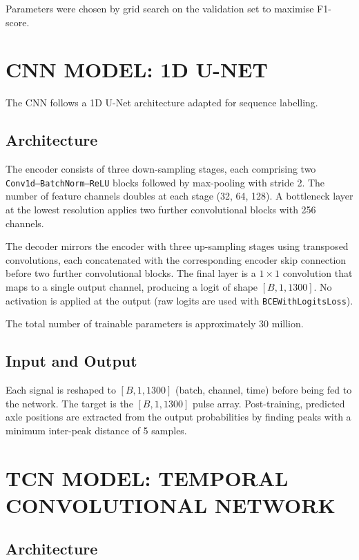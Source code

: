 Parameters were chosen by grid search on the validation set to maximise F1-score.

\section{CNN MODEL: 1D U-NET}

The CNN follows a 1D U-Net architecture \cite{Ronneberger2015} adapted for
sequence labelling.

\subsection{Architecture}

The encoder consists of three down-sampling stages, each comprising two
\texttt{Conv1d--BatchNorm--ReLU} blocks followed by max-pooling with stride 2.
The number of feature channels doubles at each stage (32, 64, 128). A bottleneck
layer at the lowest resolution applies two further convolutional blocks with 256
channels.

The decoder mirrors the encoder with three up-sampling stages using transposed
convolutions, each concatenated with the corresponding encoder skip connection
before two further convolutional blocks. The final layer is a $1{\times}1$
convolution that maps to a single output channel, producing a logit of shape
$[B, 1, 1300]$. No activation is applied at the output (raw logits are used
with \texttt{BCEWithLogitsLoss}).

The total number of trainable parameters is approximately 30 million.

\subsection{Input and Output}

Each signal is reshaped to $[B, 1, 1300]$ (batch, channel, time) before being
fed to the network. The target is the $[B, 1, 1300]$ pulse array. Post-training,
predicted axle positions are extracted from the output probabilities by finding
peaks with a minimum inter-peak distance of 5 samples.

\section{TCN MODEL: TEMPORAL CONVOLUTIONAL NETWORK}

\subsection{Architecture}

